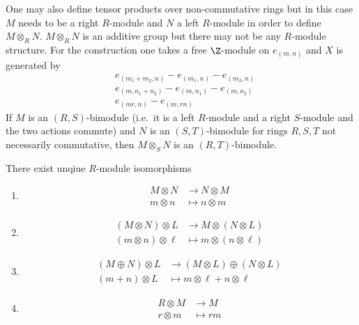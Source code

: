 \documentclass[a4paper]{article}
\begin{document}
\begin{remark}
  One may also define tensor products over non-commutative rings but in this case \(M\) needs to be a right \(R\)-module and \(N\) a left \(R\)-module in order to define \(M \otimes_R N\). \(M \otimes_R N\) is an additive group but there may not be any \(R\)-module structure. For the construction one takes a free \(\Z\)-module on \(e_{(m, n)}\) and \(X\) is generated by
  \begin{align*}
    & e_{(m_1 + m_2, n)} - e_{(m_1, n)} - e_{(m_2, n)} \\
    & e_{(m, n_1 + n_2)} - e_{(m, n_1)} - e_{(m, n_2)} \\
    & e_{(mr, n)} - e_{(m, rn)}
  \end{align*}
  If \(M\) is an \((R, S)\)-bimodule (i.e.\ it is a left \(R\)-module and a right \(S\)-module and the two actions commute) and \(N\) is an \((S, T)\)-bimodule for rings \(R, S, T\) not necessarily commutative, then \(M \otimes_S N\) is an \((R, T)\)-bimodule.
\end{remark}

\begin{lemma}
  There exist unqiue \(R\)-module isomorphisms
  \begin{enumerate}
  \item
    \begin{align*}
      M \otimes N &\to N \otimes M \\
      m \otimes n &\mapsto n \otimes m
    \end{align*}
  \item
    \begin{align*}
      (M \otimes N) \otimes L &\to M \otimes (N \otimes L) \\
      (m \otimes n) \otimes \ell &\mapsto m \otimes (n \otimes \ell)
    \end{align*}
  \item
    \begin{align*}
      (M \oplus N) \otimes L &\to (M \otimes L) \oplus (N \otimes L) \\
      (m + n) \otimes L &\mapsto m \otimes \ell + n \otimes \ell
    \end{align*}
  \item
    \begin{align*}
      R \otimes M &\to M \\
      r \otimes m &\mapsto rm
    \end{align*}
  \end{enumerate}
\end{lemma}
\end{document}

